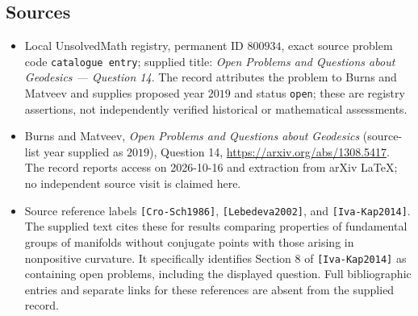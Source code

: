 \documentclass[11pt]{article}
\begin{document}
\subsection{Sources}
\begin{itemize}
\item Local UnsolvedMath registry, permanent ID \(800934\), exact source problem code \texttt{catalogue entry}; supplied title: \emph{Open Problems and Questions about Geodesics --- Question 14}. The record attributes the problem to Burns and Matveev and supplies proposed year \(2019\) and status \texttt{open}; these are registry assertions, not independently verified historical or mathematical assessments.
\item Burns and Matveev, \emph{Open Problems and Questions about Geodesics} (source-list year supplied as \(2019\)), Question 14, \url{https://arxiv.org/abs/1308.5417}. The record reports access on 2026-10-16 and extraction from arXiv LaTeX; no independent source visit is claimed here.
\item Source reference labels \texttt{[Cro-Sch1986]}, \texttt{[Lebedeva2002]}, and \texttt{[Iva-Kap2014]}. The supplied text cites these for results comparing properties of fundamental groups of manifolds without conjugate points with those arising in nonpositive curvature. It specifically identifies Section 8 of \texttt{[Iva-Kap2014]} as containing open problems, including the displayed question. Full bibliographic entries and separate links for these references are absent from the supplied record.
\end{itemize}
\end{document}
